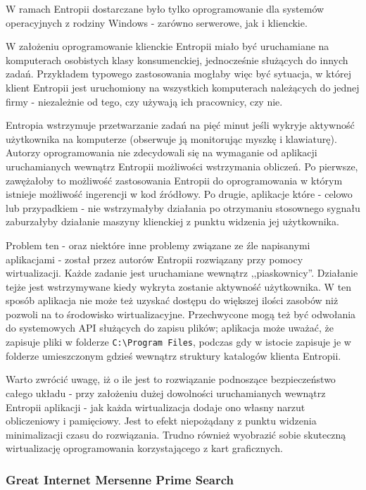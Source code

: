 \documentclass[12pt,a4paper,twoside]{article}
\begin{document}
W ramach Entropii dostarczane było tylko oprogramowanie dla systemów operacyjnych z rodziny Windows - zarówno serwerowe, jak i klienckie.

W założeniu oprogramowanie klienckie Entropii miało być uruchamiane na komputerach osobistych klasy konsumenckiej, jednocześnie służących do innych zadań. Przykładem typowego zastosowania mogłaby więc być sytuacja, w której klient Entropii jest uruchomiony na wszystkich komputerach należących do jednej firmy - niezależnie od tego, czy używają ich pracownicy, czy nie.

Entropia wstrzymuje przetwarzanie zadań na pięć minut jeśli wykryje aktywność użytkownika na komputerze (obserwuje ją monitorując myszkę i klawiaturę). Autorzy oprogramowania nie zdecydowali się na wymaganie od aplikacji uruchamianych wewnątrz Entropii możliwości wstrzymania obliczeń. Po pierwsze, zawężałoby to możliwość zastosowania Entropii do oprogramowania w którym istnieje możliwość ingerencji w kod źródłowy. Po drugie, aplikacje które - celowo lub przypadkiem - nie wstrzymałyby działania po otrzymaniu stosownego sygnału zaburzałyby działanie maszyny klienckiej z punktu widzenia jej użytkownika.

Problem ten - oraz niektóre inne problemy związane ze źle napisanymi aplikacjami - został przez autorów Entropii rozwiązany przy pomocy wirtualizacji. Każde zadanie jest uruchamiane wewnątrz ,,piaskownicy''. Działanie tejże jest wstrzymywane kiedy wykryta zostanie aktywność użytkownika. W ten sposób aplikacja nie może też uzyskać dostępu do większej ilości zasobów niż pozwoli na to środowisko wirtualizacyjne. Przechwycone mogą też być odwołania do systemowych API służących do zapisu plików; aplikacja może uważać, że zapisuje pliki w folderze \texttt{C:\textbackslash{}Program Files}, podczas gdy w istocie zapisuje je w folderze umieszczonym gdzieś wewnątrz struktury katalogów klienta Entropii.

Warto zwrócić uwagę, iż o ile jest to rozwiązanie podnoszące bezpieczeństwo całego układu - przy założeniu dużej dowolności uruchamianych wewnątrz Entropii aplikacji - jak każda wirtualizacja dodaje ono własny narzut obliczeniowy i pamięciowy. Jest to efekt niepożądany z punktu widzenia minimalizacji czasu do rozwiązania. Trudno również wyobrazić sobie skuteczną wirtualizację oprogramowania korzystającego z kart graficznych.

\subsubsection{Great Internet Mersenne Prime Search}
\end{document}
